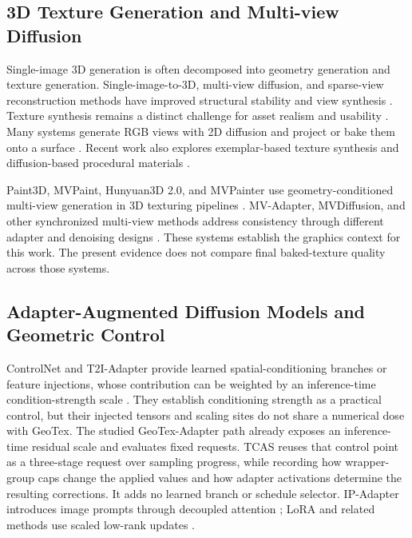 \documentclass[times,twocolumn,final]{elsarticle}
\begin{document}
\subsection{3D Texture Generation and Multi-view Diffusion}
\label{subsec:3dtex}

Single-image 3D generation is often decomposed into geometry generation and texture generation. Single-image-to-3D, multi-view diffusion, and sparse-view reconstruction methods have improved structural stability and view synthesis \cite{liu2023zero1to3,shi2023zero123pp,liu2023syncdreamer,long2023wonder3d,shi2024mvdream,wang2023imagedream,xu2024instantmesh,ke2024era3d}. Texture synthesis remains a distinct challenge for asset realism and usability \cite{perla2026survey}. Many systems generate RGB views with 2D diffusion and project or bake them onto a surface \cite{chen2023text2tex,richardson2023texture,poole2023dreamfusion,chen2023fantasia3d}. Recent work also explores exemplar-based texture synthesis and diffusion-based procedural materials \cite{guzman2026adaptive,lv2025interpretable}.

Paint3D, MVPaint, Hunyuan3D 2.0, and MVPainter use geometry-conditioned multi-view generation in 3D texturing pipelines \cite{zeng2024paint3d,cheng2024mvpaint,lai2025hunyuan3d,shao2025mvpainter}. MV-Adapter, MVDiffusion, and other synchronized multi-view methods address consistency through different adapter and denoising designs \cite{huang2024mvadapter,tang2023mvdiffusion,liu2024synchronized,xu2026wondertex}. These systems establish the graphics context for this work. The present evidence does not compare final baked-texture quality across those systems.

\subsection{Adapter-Augmented Diffusion Models and Geometric Control}
\label{subsec:adapter}

ControlNet and T2I-Adapter provide learned spatial-conditioning branches or feature injections, whose contribution can be weighted by an inference-time condition-strength scale \cite{mou2023t2iadapter,zhang2023controlnet}. They establish conditioning strength as a practical control, but their injected tensors and scaling sites do not share a numerical dose with GeoTex. The studied GeoTex-Adapter path already exposes an inference-time residual scale and evaluates fixed requests. TCAS reuses that control point as a three-stage request over sampling progress, while recording how wrapper-group caps change the applied values and how adapter activations determine the resulting corrections. It adds no learned branch or schedule selector. IP-Adapter introduces image prompts through decoupled attention \cite{ye2023ipadapter}; LoRA and related methods use scaled low-rank updates \cite{hu2022lora,liu2024dora,zhang2023adalora}.
\end{document}
